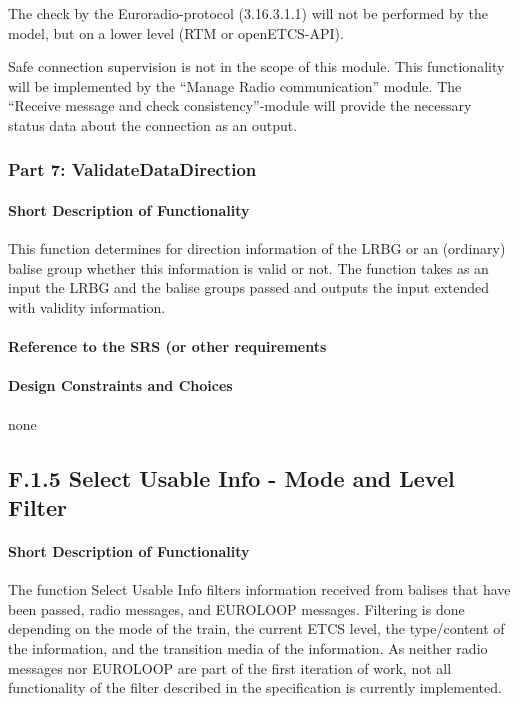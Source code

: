 \documentclass{template/openetcs_report}
\begin{document}
The check by the Euroradio-protocol (3.16.3.1.1) will not be performed by the model, but on a lower level (RTM or openETCS-API).

Safe connection supervision is not in the scope of this module. This functionality will be implemented by the ``Manage Radio communication'' module. The ``Receive message and check consistency''-module will provide the necessary status data about the connection as an output.

\subsubsection{Part 7: ValidateDataDirection}

\paragraph{Short Description of Functionality}
This function determines for direction information of the LRBG or an (ordinary) balise group whether this information is valid or not. The function takes as an input the LRBG and the balise groups passed and outputs the input extended with validity information.

\paragraph{Reference to the SRS (or other requirements}


\paragraph{Design Constraints and Choices}
none

\subsection{F.1.5 Select Usable Info - Mode and Level Filter}

\paragraph{Short Description of Functionality}
The function Select Usable Info filters information received from balises that have been passed, radio messages, and EUROLOOP messages. Filtering is done depending on the mode of the train, the current ETCS level, the type/content of the information, and the transition media of the information. As neither radio messages nor EUROLOOP are part of the first iteration of work, not all functionality of the filter described in the specification is currently implemented.
\end{document}
